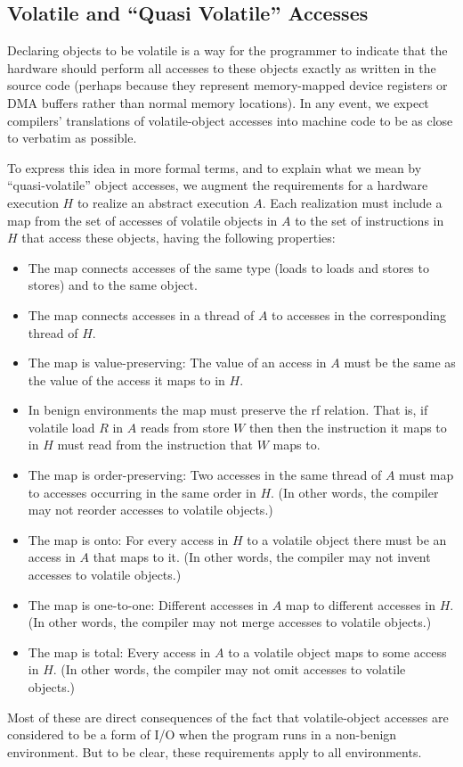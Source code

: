 \documentclass[10]{article}
\begin{document}
\subsection{Volatile and ``Quasi Volatile'' Accesses}
\label{sec:Volatile and Quasi Volatile Accesses}

Declaring objects to be volatile is a way for the programmer to
indicate that the hardware should perform all accesses to these
objects exactly as written in the source code (perhaps because they
represent memory-mapped device registers or DMA buffers rather than
normal memory locations).
In any event, we expect compilers' translations of volatile-object accesses
into machine code to be as close to verbatim as possible.

To express this idea in more formal terms,
and to explain what we mean by ``quasi-volatile'' object accesses,
we augment the
requirements for a hardware execution $H$ to realize an abstract
execution $A$.
Each realization must include a map from the set of accesses of
volatile objects in $A$ to the set of instructions in $H$ that access
these objects, having the following properties:
\begin{itemize}
\item	The map connects accesses of the same type (loads to loads
	and stores to stores) and to the same object.
\item	The map connects accesses in a thread of $A$ to accesses in
	the corresponding thread of $H$.
\item	The map is value-preserving: The value of an access in $A$ must be
	the same as the value of the access it maps to in $H$.
\item	In benign environments the map must preserve the rf relation.
	That is, if volatile load $R$ in $A$ reads from store $W$ then
	then the instruction it maps to in $H$ must read from the
	instruction that $W$ maps to.
\item	The map is order-preserving: Two accesses in the same thread
	of $A$ must map to accesses occurring in the same order in $H$.
	(In other words, the compiler may not reorder accesses
	to volatile objects.)
\item	The map is onto: For every access in $H$ to a volatile object
	there must be an access in $A$ that maps to it.
	(In other words, the compiler may not invent accesses to
	volatile objects.)
\item	The map is one-to-one: Different accesses in $A$ map to
	different accesses in $H$.
	(In other words, the compiler may not merge accesses to
	volatile objects.)
\item	The map is total: Every access in $A$ to a volatile object
	maps to some access in $H$.
	(In other words, the compiler may not omit accesses to
	volatile objects.)
\end{itemize}
Most of these are direct consequences of the fact that volatile-object
accesses are considered to be a form of I/O when the program runs
in a non-benign environment.
But to be clear, these requirements apply to all environments.
\end{document}
